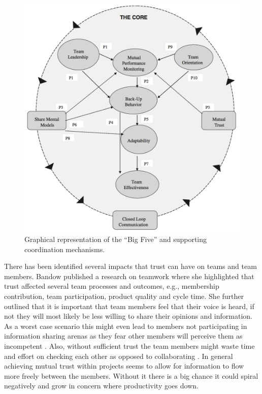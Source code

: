 \begin{figure}
\centering
\includegraphics[width=\textwidth]{images/salas.png}
\caption{Graphical representation of the ``Big Five'' and supporting coordination mechanisms.}
\label{salas}
\end{figure}

There has been identified several impacts that trust can have on teams and team members. Bandow published a research on teamwork where she highlighted that trust affected several team processes and outcomes, e.g., membership contribution, team participation, product quality and cycle time. She further outlined that it is important that team members feel that their voice is heard, if not they will most likely be less willing to share their opinions and information. As a worst case scenario this might even lead to members not participating in information sharing arenas as they fear other members will perceive them as incompetent \cite{Bandow2001}. Also, without sufficient trust the team members might waste time and effort on checking each other as opposed to collaborating \cite{cooper1998executive}. In general achieving mutual trust within projects seems to allow for information to flow more freely between the members. Without it there is a big chance it could spiral negatively and grow in concern where productivity goes down.

